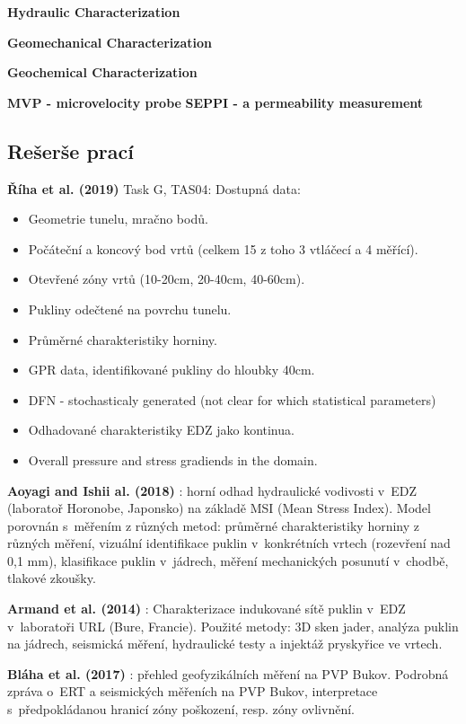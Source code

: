 \documentclass{article}
\begin{document}
{\bf  Hydraulic Characterization} \cite{Lanyon2011}

{\bf  Geomechanical Characterization} \cite{Lanyon2011}

{\bf  Geochemical Characterization} \cite{Lanyon2011}

{\bf MVP - microvelocity probe} \cite{Rutqvist2009} 
{\bf SEPPI - a permeability measurement} \cite{Rutqvist2009} 


\subsection{Rešerše prací}

{\bf Říha et al. (2019)} Task G, TAS04: Dostupná data: 
\begin{itemize}
    \item Geometrie tunelu, mračno bodů.
    \item Počáteční a koncový bod vrtů (celkem 15 z toho 3 vtláčecí a 4 měřící).
    \item Otevřené zóny vrtů (10-20cm, 20-40cm, 40-60cm).
    \item Pukliny odečtené na povrchu tunelu.
    \item Průměrné charakteristiky horniny.
    \item GPR data, identifikované pukliny do hloubky 40cm.
    \item DFN - stochasticaly generated (not clear for which statistical parameters)
    \item Odhadované charakteristiky EDZ jako kontinua.
    \item Overall pressure and stress gradiends in the domain.
\end{itemize}

{\bf Aoyagi and Ishii al. (2018)} \cite{Aoyagi2018}: horní odhad hydraulické vodivosti v~EDZ (laboratoř Horonobe, Japonsko) na základě MSI (Mean Stress Index). Model porovnán s~měřením z různých metod: průměrné charakteristiky horniny z různých měření, vizuální identifikace puklin v~konkrétních vrtech (rozevření nad 0,1 mm), klasifikace puklin v~jádrech, měření mechanických posunutí v~chodbě, tlakové zkoušky.

{\bf Armand et al. (2014)} \cite{Armand2014}: Charakterizace indukované sítě puklin v~EDZ v~laboratoři URL (Bure, Francie). Použité metody: 3D sken jader, analýza puklin na jádrech, seismická měření, hydraulické testy a injektáž pryskyřice ve vrtech. 

{\bf Bláha et al. (2017)} \cite{SURAO_184/2014}: přehled geofyzikálních měření na PVP Bukov.
Podrobná zpráva o~ERT a seismických měřeních na PVP Bukov, interpretace s~předpokládanou hranicí zóny poškození, resp. zóny ovlivnění.  
\end{document}

